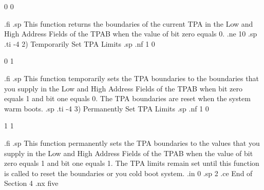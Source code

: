                          0       0   

.fi
.sp
This function returns the boundaries of the current TPA in the 
Low and High Address Fields of the TPAB when the value of bit 
zero equals 0.
.ne 10
.sp
.ti -4
2)  Temporarily Set TPA Limits 
.sp
.nf
                         1       0               
  
                         0       1   

.fi
.sp
This function temporarily sets the TPA boundaries to the
boundaries that you supply in the Low and High Address Fields of
the TPAB when bit zero equals 1 and bit one equals 0. The TPA
boundaries are reset when the system 
warm boots.
.sp
.ti -4
3) Permanently Set TPA Limits
.sp
.nf
                         1       0               
  
                         1       1   

.fi
.sp
This function permanently sets the TPA boundaries to the values 
that you supply in the Low and High Address Fields of the TPAB 
when the value of bit zero equals 1 and bit one equals 1. The
TPA limits remain set until this function is called to reset the
boundaries or you cold boot system.
.in 0
.sp 2
.ce
End of Section 4
.nx five

